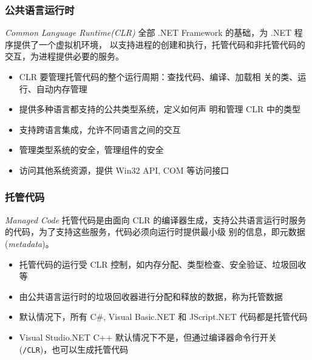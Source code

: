 \begin{frame}
\frametitle{公共语言运行时}
\begin{block}{\textit{Common Language Runtime(CLR)}}
  \CJKindent 全部 .NET Framework 的基础，为 .NET 程序提供了一个虚拟机环境，
  以支持进程的创建和执行，托管代码和非托管代码的交互，为进程提供必要的服务。
\end{block}


\begin{itemize}
\item<2-| handout:1> CLR 要管理\alert<2| handout:0>{托管代码}的整个运行周期：查找代码、编译、加载相
  关的类、运行、自动内存管理
\item<3-| handout:1> 提供多种语言都支持的\alert<3| handout:0>{公共类型系统}，定义如何声
  明和管理 CLR 中的类型
\item<4-| handout:1> 支持跨语言集成，允许不同语言之间的交互
\item<4-| handout:1> 管理类型系统的安全，管理组件的安全
\item<4-| handout:1> 访问其他系统资源，提供 Win32 API, COM 等访问接口
\end{itemize}

\end{frame}

\begin{frame}
\frametitle{托管代码}

\begin{block}{\textit{Managed Code}}
  \CJKindent 托管代码是由面向 CLR 的编译器生成，支持公共语言运行时服务的代码，为了支持这些服务，代码必须向运行时提供最小级
  别的信息，即元数据 (\textit{metadata})。
\end{block}

\pause
\begin{itemize}
\item 托管代码的运行受 CLR 控制，如内存分配、类型检查、安全验证、垃圾回收等
\item 由公共语言运行时的垃圾回收器进行分配和释放的数据，称为托管数据
\item 默认情况下，所有 C\#, Visual Basic.NET 和 JScript.NET 代码都是托管代码
\item Visual Studio.NET C++ 默认情况下不是，但通过编译器命令行开关 (\texttt{/CLR})，也可以生成托管代码
\end{itemize}
\end{frame}

